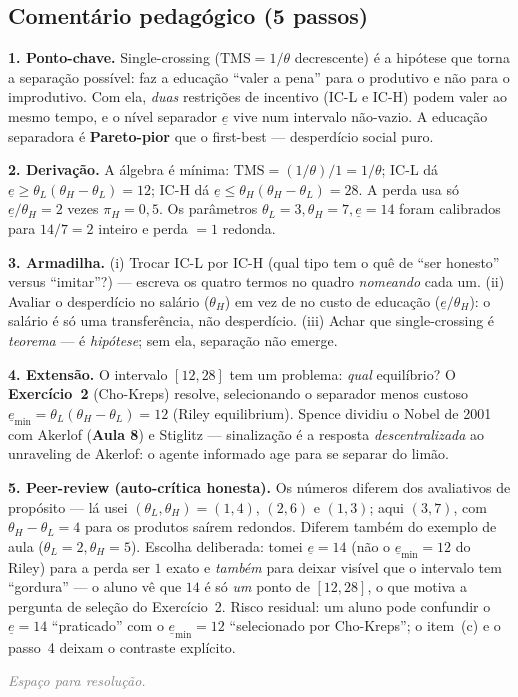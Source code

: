 \documentclass[11pt,a4paper]{article}
\newcommand{\TMS}{\text{TMS}}
\newcommand{\dc}[2]{#1{,}#2}
\newcommand{\passo}[1]{\smallskip\noindent\textbf{\textcolor{insper}{#1}}\quad}
\newcommand{\espacoaluno}[1]{%
  \par\smallskip\noindent\textit{\textcolor{gray}{Espaço para resolução.}}%
  \par\vspace{#1}\noindent\textcolor{insper!30}{\hrulefill}\par\medskip}
\begin{document}
\subsection*{Comentário pedagógico (5 passos)}
\begin{gabarito}
\passo{1. Ponto-chave.} Single-crossing ($\TMS=1/\theta$ decrescente) é a hipótese que torna
a separação possível: faz a educação ``valer a pena'' para o produtivo e não para o
improdutivo. Com ela, \emph{duas} restrições de incentivo (IC-L e IC-H) podem valer ao mesmo
tempo, e o nível separador $\underline e$ vive num intervalo não-vazio. A educação separadora é
\textbf{Pareto-pior} que o first-best — desperdício social puro.

\passo{2. Derivação.} A álgebra é mínima: $\TMS=(1/\theta)/1=1/\theta$; IC-L dá
$\underline e\ge\theta_L(\theta_H-\theta_L)=12$; IC-H dá
$\underline e\le\theta_H(\theta_H-\theta_L)=28$. A perda usa só $\underline e/\theta_H=2$ vezes
$\pi_H=\dc{0}{5}$. Os parâmetros $\theta_L=3,\theta_H=7,\underline e=14$ foram calibrados para
$14/7=2$ inteiro e perda $=1$ redonda.

\passo{3. Armadilha.} (i) Trocar IC-L por IC-H (qual tipo tem o quê de ``ser honesto''
versus ``imitar''?) — escreva os quatro termos no quadro \emph{nomeando} cada um. (ii) Avaliar
o desperdício no salário ($\theta_H$) em vez de no custo de educação ($\underline e/\theta_H$):
o salário é só uma transferência, não desperdício. (iii) Achar que single-crossing é
\emph{teorema} — é \emph{hipótese}; sem ela, separação não emerge.

\passo{4. Extensão.} O intervalo $[12,28]$ tem um problema: \emph{qual} equilíbrio? O
\textbf{Exercício~2} (Cho-Kreps) resolve, selecionando o separador menos custoso
$\underline e_{\min}=\theta_L(\theta_H-\theta_L)=12$ (Riley equilibrium). Spence dividiu o
Nobel de 2001 com Akerlof (\textbf{Aula 8}) e Stiglitz — sinalização é a resposta
\emph{descentralizada} ao unraveling de Akerlof: o agente informado age para se separar do limão.

\passo{5. Peer-review (auto-crítica honesta).} Os números diferem dos avaliativos de propósito
— lá usei $(\theta_L,\theta_H)=(1,4)$, $(2,6)$ e $(1,3)$; aqui $(3,7)$, com
$\theta_H-\theta_L=4$ para os produtos saírem redondos. Diferem também do exemplo de aula
($\theta_L=2,\theta_H=5$). Escolha deliberada: tomei $\underline e=14$ (não o $\underline
e_{\min}=12$ do Riley) para a perda ser $1$ exato e \emph{também} para deixar visível que o
intervalo tem ``gordura'' — o aluno vê que $14$ é só \emph{um} ponto de $[12,28]$, o que motiva
a pergunta de seleção do Exercício~2. Risco residual: um aluno pode confundir o $\underline
e=14$ ``praticado'' com o $\underline e_{\min}=12$ ``selecionado por Cho-Kreps''; o item~(c) e o
passo~4 deixam o contraste explícito.
\end{gabarito}
\else
\espacoaluno{80mm}
\fi
\end{document}
